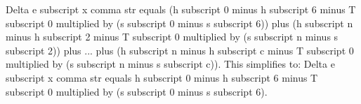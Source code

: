 Delta e subscript x comma str equals (h subscript 0 minus h subscript 6 minus T subscript 0 multiplied by (s subscript 0 minus s subscript 6)) plus (h subscript n minus h subscript 2 minus T subscript 0 multiplied by (s subscript n minus s subscript 2)) plus ... plus (h subscript n minus h subscript c minus T subscript 0 multiplied by (s subscript n minus s subscript c)).  
This simplifies to:  
Delta e subscript x comma str equals h subscript 0 minus h subscript 6 minus T subscript 0 multiplied by (s subscript 0 minus s subscript 6).